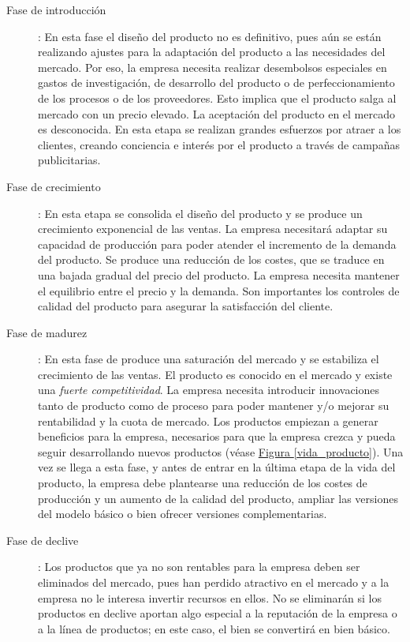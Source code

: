 \documentclass[10pt,a4paper,spanish]{report}
\begin{document}
                        \begin{description}
                              \item[Fase de introducción]: En esta fase el diseño del producto no es definitivo, pues aún se están realizando ajustes para la adaptación del producto a las necesidades del mercado. Por eso, la empresa necesita realizar desembolsos especiales en gastos de investigación, de desarrollo del producto o de perfeccionamiento de los procesos o de los proveedores. Esto implica que el producto salga al mercado con un precio elevado. La aceptación del producto en el mercado es desconocida. En esta etapa se realizan grandes esfuerzos por atraer a los clientes, creando conciencia e interés por el producto a través de campañas publicitarias.
                              \item[Fase de crecimiento]: En esta etapa se consolida el diseño del producto y se produce un crecimiento exponencial de las ventas. La empresa necesitará adaptar su capacidad de producción para poder atender el incremento de la demanda del producto. Se produce una reducción de los costes, que se traduce en una bajada gradual del precio del producto. La empresa necesita mantener el equilibrio entre el precio y la demanda. Son importantes los controles de calidad del producto para asegurar la satisfacción del cliente.
                              \item[Fase de madurez]: En esta fase de produce una saturación del mercado y se estabiliza el crecimiento de las ventas. El producto es conocido en el mercado y existe una \textit{\textcolor[rgb]{0.9,0.7,0.6}{fuerte competitividad}}. La empresa necesita introducir innovaciones tanto de producto como de proceso para poder mantener y/o mejorar su rentabilidad y la cuota de mercado. Los productos empiezan a generar beneficios para la empresa, necesarios para que la empresa crezca y pueda seguir desarrollando nuevos productos (véase \hyperref[vida_producto]{Figura \ref*{vida_producto}}). Una vez se llega a esta fase, y antes de entrar en la última etapa de la vida del producto, la empresa debe plantearse una reducción de los costes de producción y un aumento de la calidad del producto, ampliar las versiones del modelo básico o bien ofrecer versiones complementarias.
                              \item[Fase de declive]: Los productos que ya no son rentables para la empresa deben ser eliminados del mercado, pues han perdido atractivo en el mercado y a la empresa no le interesa invertir recursos en ellos. No se eliminarán si los productos en declive aportan algo especial a la reputación de la empresa o a la línea de productos; en este caso, el bien se convertirá en bien básico.
                        \end{description}
\end{document}
